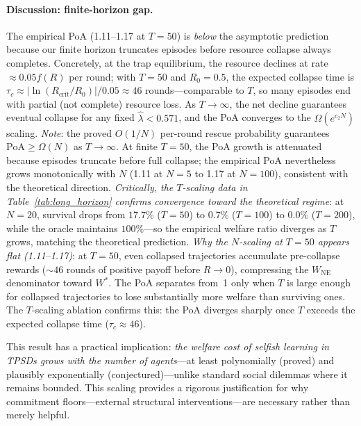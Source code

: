 \paragraph{Discussion: finite-horizon gap.}
The empirical PoA (1.11--1.17 at $T{=}50$) is \emph{below}
the asymptotic prediction because our finite horizon truncates
episodes before resource collapse always completes. Concretely,
at the trap equilibrium, the resource declines at rate
${\approx}0.05f(R)$ per round; with $T{=}50$ and
$R_0{=}0.5$, the expected collapse time is
$\tau_c \approx |\ln(R_{\mathrm{crit}}/R_0)| / 0.05 \approx 46$
rounds---comparable to $T$, so many episodes end with partial
(not complete) resource loss. As $T \to \infty$, the net decline
guarantees eventual collapse for any fixed $\hat\lambda < 0.571$,
and the PoA converges to the $\Omega(e^{c_2 N})$ scaling.
\emph{Note}: the proved $O(1/N)$ per-round rescue probability
guarantees $\mathrm{PoA} \geq \Omega(N)$ as $T \to \infty$.
At finite $T{=}50$, the PoA growth is attenuated because
episodes truncate before full collapse; the empirical PoA
nevertheless grows monotonically with $N$
(1.11 at $N{=}5$ to 1.17 at $N{=}100$), consistent with
the theoretical direction. \emph{Critically, the $T$-scaling data
in Table~\ref{tab:long_horizon} confirms convergence toward
the theoretical regime}: at $N{=}20$, survival drops from
$17.7\%$ ($T{=}50$) to $0.7\%$ ($T{=}100$) to $0.0\%$
($T{=}200$), while the oracle maintains $100\%$---so the
empirical welfare ratio diverges as $T$ grows, matching
the theoretical prediction.
\emph{Why the $N$-scaling at $T{=}50$ appears flat
(1.11--1.17)}: at $T{=}50$, even collapsed trajectories
accumulate pre-collapse rewards (${\sim}46$ rounds of positive
payoff before $R \to 0$), compressing the $W_{\mathrm{NE}}$
denominator toward $W^*$. The PoA separates from~1 only when
$T$ is large enough for collapsed trajectories to lose
substantially more welfare than surviving ones. The $T$-scaling
ablation confirms this: the PoA diverges sharply once $T$
exceeds the expected collapse time ($\tau_c \approx 46$).

This result has a practical implication:
\emph{the welfare cost of selfish learning in TPSDs
grows with the number of agents}---at least polynomially
(proved) and plausibly exponentially (conjectured)---unlike
standard social dilemmas where it remains bounded.
This scaling provides a rigorous justification
for why commitment floors---external structural
interventions---are necessary rather than merely helpful.

